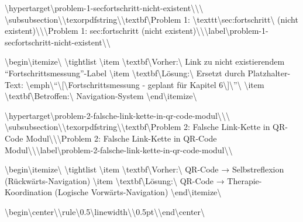 \textbackslash{}hypertarget\textbackslash{}{problem-1-secfortschritt-nicht-existent\textbackslash{}}\textbackslash{}{\textbackslash{}%
\textbackslash{}subsubsection\textbackslash{}{\textbackslash{}texorpdfstring\textbackslash{}{\textbackslash{}textbf\textbackslash{}{Problem 1: \textbackslash{}texttt\textbackslash{}{sec:fortschritt\textbackslash{}} (nicht existent)\textbackslash{}}\textbackslash{}}\textbackslash{}{Problem 1: sec:fortschritt (nicht existent)\textbackslash{}}\textbackslash{}}\textbackslash{}label\textbackslash{}{problem-1-secfortschritt-nicht-existent\textbackslash{}}\textbackslash{}}

\textbackslash{}begin\textbackslash{}{itemize\textbackslash{}}
\textbackslash{}tightlist
\textbackslash{}item
  \textbackslash{}textbf\textbackslash{}{Vorher:\textbackslash{}} Link zu nicht existierendem ``Fortschrittsmessung''-Label
\textbackslash{}item
  \textbackslash{}textbf\textbackslash{}{Lösung:\textbackslash{}} Ersetzt durch Platzhalter-Text: \textbackslash{}emph\textbackslash{}{``\textbackslash{}{[\textbackslash{}}Fortschrittsmessung - geplant für Kapitel 6\textbackslash{}{]\textbackslash{}}''\textbackslash{}}
\textbackslash{}item
  \textbackslash{}textbf\textbackslash{}{Betroffen:\textbackslash{}} Navigation-System
\textbackslash{}end\textbackslash{}{itemize\textbackslash{}}

\textbackslash{}hypertarget\textbackslash{}{problem-2-falsche-link-kette-in-qr-code-modul\textbackslash{}}\textbackslash{}{\textbackslash{}%
\textbackslash{}subsubsection\textbackslash{}{\textbackslash{}texorpdfstring\textbackslash{}{\textbackslash{}textbf\textbackslash{}{Problem 2: Falsche Link-Kette in QR-Code Modul\textbackslash{}}\textbackslash{}}\textbackslash{}{Problem 2: Falsche Link-Kette in QR-Code Modul\textbackslash{}}\textbackslash{}}\textbackslash{}label\textbackslash{}{problem-2-falsche-link-kette-in-qr-code-modul\textbackslash{}}\textbackslash{}}

\textbackslash{}begin\textbackslash{}{itemize\textbackslash{}}
\textbackslash{}tightlist
\textbackslash{}item
  \textbackslash{}textbf\textbackslash{}{Vorher:\textbackslash{}} QR-Code → Selbstreflexion (Rückwärts-Navigation)
\textbackslash{}item
  \textbackslash{}textbf\textbackslash{}{Lösung:\textbackslash{}} QR-Code → Therapie-Koordination (Logische Vorwärts-Navigation)
\textbackslash{}end\textbackslash{}{itemize\textbackslash{}}

\textbackslash{}begin\textbackslash{}{center\textbackslash{}}\textbackslash{}rule\textbackslash{}{0.5\textbackslash{}linewidth\textbackslash{}}\textbackslash{}{0.5pt\textbackslash{}}\textbackslash{}end\textbackslash{}{center\textbackslash{}}

